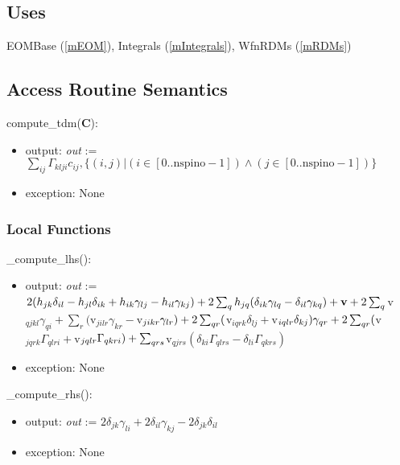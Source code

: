 \documentclass[12pt, titlepage]{article}
\begin{document}
\subsection{Uses}
EOMBase (\ref{mEOM}), Integrals (\ref{mIntegrals}), WfnRDMs (\ref{mRDMs})

\subsection{Access Routine Semantics}
\noindent compute\_tdm(\textbf{C}):
\begin{itemize}
	\item output: \textit{out} := $\sum_{ij}\Gamma_{klji} c_{ij}, \{(i,j)|(i\in 
	[0..\text{nspino}-1]) \land (j\in 
	[0..\text{nspino}-1])\}$
	\item exception: None
\end{itemize}

\subsubsection{Local Functions}
\noindent \_compute\_lhs():
\begin{itemize}
	\item output: \textit{out} := \\
	$2(h_{jk}\delta_{il} -h_{jl} \delta_{ik} 
	+ h_{ik} \gamma_{lj} - h_{il}\gamma_{kj})\\
	+ 2 \sum_{q} h_{jq}( \delta_{ik} \gamma_{lq} - \delta_{il} \gamma_{kq})
	+ \mathbf{v} \\+ 2 \sum_{q}  $v$_{qjkl} \gamma_{qi}
	+ \sum_{r} ($v$_{jilr} \gamma_{kr} - 
	$v$_{jikr} \gamma_{lr})\\
	+ 2 \sum_{qr} ($v$_{iqrk}  \delta_{lj} + $v$_{iqlr} 
	\delta_{kj})\gamma_{qr}\\
	+ 2 \sum_{qr} ($v$_{jqrk}\Gamma_{qlri} + 
	$v$_{jqlr}\Gamma_{qkri})\\
	+ \sum_{qrs} $v$_{qjrs}(\delta_{ki}\Gamma_{qlrs} - 
	\delta_{li}\Gamma_{qkrs})$
	\item exception: None 
\end{itemize}

\noindent\_compute\_rhs():
\begin{itemize}
	\item output: \textit{out} := $2\delta_{jk} \gamma_{li} +2\delta_{il} 
	\gamma_{kj}	- 2\delta_{jk} \delta_{il}$
	\item exception: None 
\end{itemize}
\end{document}
